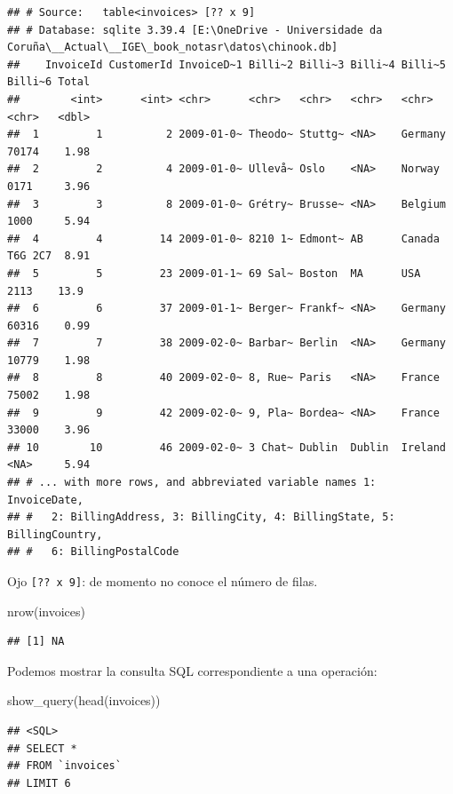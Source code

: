 \documentclass[
]{book}
\newenvironment{Shaded}{\begin{snugshade}}{\end{snugshade}}
\newcommand{\FunctionTok}[1]{\textcolor[rgb]{0.00,0.00,0.00}{#1}}
\newcommand{\NormalTok}[1]{#1}
\theoremstyle{break}
\theoremstyle{nonumberplain}
\begin{document}
\begin{verbatim}
## # Source:   table<invoices> [?? x 9]
## # Database: sqlite 3.39.4 [E:\OneDrive - Universidade da Coruña\__Actual\__IGE\_book_notasr\datos\chinook.db]
##    InvoiceId CustomerId InvoiceD~1 Billi~2 Billi~3 Billi~4 Billi~5 Billi~6 Total
##        <int>      <int> <chr>      <chr>   <chr>   <chr>   <chr>   <chr>   <dbl>
##  1         1          2 2009-01-0~ Theodo~ Stuttg~ <NA>    Germany 70174    1.98
##  2         2          4 2009-01-0~ Ullevå~ Oslo    <NA>    Norway  0171     3.96
##  3         3          8 2009-01-0~ Grétry~ Brusse~ <NA>    Belgium 1000     5.94
##  4         4         14 2009-01-0~ 8210 1~ Edmont~ AB      Canada  T6G 2C7  8.91
##  5         5         23 2009-01-1~ 69 Sal~ Boston  MA      USA     2113    13.9 
##  6         6         37 2009-01-1~ Berger~ Frankf~ <NA>    Germany 60316    0.99
##  7         7         38 2009-02-0~ Barbar~ Berlin  <NA>    Germany 10779    1.98
##  8         8         40 2009-02-0~ 8, Rue~ Paris   <NA>    France  75002    1.98
##  9         9         42 2009-02-0~ 9, Pla~ Bordea~ <NA>    France  33000    3.96
## 10        10         46 2009-02-0~ 3 Chat~ Dublin  Dublin  Ireland <NA>     5.94
## # ... with more rows, and abbreviated variable names 1: InvoiceDate,
## #   2: BillingAddress, 3: BillingCity, 4: BillingState, 5: BillingCountry,
## #   6: BillingPostalCode
\end{verbatim}

Ojo \texttt{{[}??\ x\ 9{]}}: de momento no conoce el número de filas.

\begin{Shaded}
\begin{Highlighting}[]
\FunctionTok{nrow}\NormalTok{(invoices)}
\end{Highlighting}
\end{Shaded}

\begin{verbatim}
## [1] NA
\end{verbatim}

Podemos mostrar la consulta SQL correspondiente a una operación:

\begin{Shaded}
\begin{Highlighting}[]
\FunctionTok{show\_query}\NormalTok{(}\FunctionTok{head}\NormalTok{(invoices))}
\end{Highlighting}
\end{Shaded}

\begin{verbatim}
## <SQL>
## SELECT *
## FROM `invoices`
## LIMIT 6
\end{verbatim}
\end{document}

